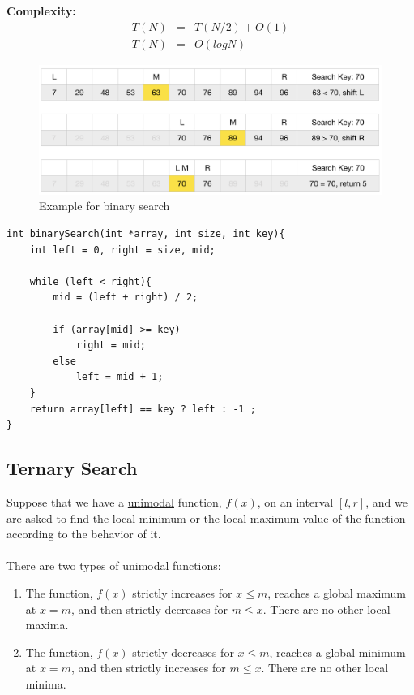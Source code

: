 \documentclass[12pt]{article}
\begin{document}
\textbf{Complexity: }
\begin{eqnarray*}
T(N) &=& T(N / 2) + O(1) \\
T(N) &=& O(logN)
\end{eqnarray*}


\begin{figure}[h]
	\centering
	\includegraphics[width=0.9\linewidth]{binary_search}
	\caption{Example for binary search}
	\label{fig:binary_search}
\end{figure}

\cleardoublepage

\begin{verbatim}
int binarySearch(int *array, int size, int key){
    int left = 0, right = size, mid;

    while (left < right){
        mid = (left + right) / 2;

        if (array[mid] >= key)
            right = mid;
        else
            left = mid + 1;
    }
    return array[left] == key ? left : -1 ;
}
\end{verbatim}

				\cleardoublepage
		\subsection{Ternary Search}

Suppose that we have a \href{https://www.geeksforgeeks.org/mathematics-unimodal-functions-bimodal-functions/}{unimodal} function, $f(x)$, on an interval $[l, r]$, and we are asked to find the local minimum or the local maximum value of the function according to the behavior of it. \\ \\
There are two types of unimodal functions:

\begin{enumerate}
	\item The function, $f(x)$ strictly increases for $x \leq m$, reaches a global maximum at $x = m$, and then strictly decreases for $m \leq x$. There are no other local maxima.
	
	\item The function, $f(x)$ strictly decreases for $x \leq m$, reaches a global minimum at $x = m$, and then strictly increases for $m \leq x$. There are no other local minima.
\end{enumerate}
\end{document}
